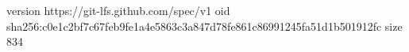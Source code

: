 version https://git-lfs.github.com/spec/v1
oid sha256:c0e1c2bf7c67feb9fe1a4e5863c3a847d78fe861c86991245fa51d1b501912fc
size 834
